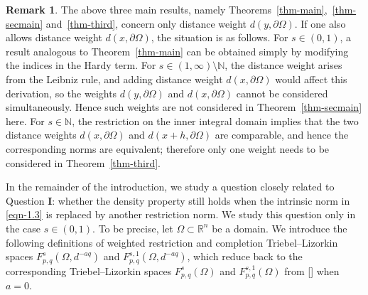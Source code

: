 \documentclass[11pt,twoside]{article}
\def\rr{{\mathbb R}}
\def\rn{{\mathbb{R}^n}}
\def\boz{{\Omega}}
\def\pa{\partial}                %
\theoremstyle{mylem}
\theoremstyle{definition}
\newtheorem{remark}[theorem]{Remark}
\numberwithin{equation}{section}
\begin{document}
\begin{remark}
The above three main results, namely
Theorems~\ref{thm-main},~\ref{thm-secmain} and~\ref{thm-third}, concern
only distance weight $d(y,\pa\boz)$. If one also allows
distance weight $d(x,\pa\boz)$, the situation is as
follows. For \(s\in(0,1)\), a result analogous to
Theorem~\ref{thm-main} can be obtained simply by modifying the indices
in the Hardy term. 
For \(s\in(1,\infty)\setminus\mathbb N\), the distance weight arises from the Leibniz rule, and adding distance weight $d(x,\pa\boz)$ would affect this derivation, so the weights $d(y,\pa\boz)$ and $d(x,\pa\boz)$ cannot be considered simultaneously.
Hence such weights are not considered in Theorem~\ref{thm-secmain} here. 
For \(s\in\mathbb N\), the
restriction on the inner integral domain implies that the two distance
weights \(d(x,\pa\boz)\) and \(d(x+h,\pa\boz)\) are comparable, and hence
the corresponding norms are equivalent; therefore only one weight needs
to be considered in Theorem~\ref{thm-third}.
\end{remark}

In the remainder of the introduction, we study a question closely related to 
Question {\bf I}: whether the density property still holds when 
the intrinsic norm in \eqref{eqn-1.3} is replaced by another  restriction norm. 
We study this question only in the case $s\in (0,1)$. To be precise, 
let $\Omega\subset \rn$ be a domain. We introduce the following definitions of 
weighted restriction and completion Triebel--Lizorkin spaces $F_{p, q}^{s}(\boz,d^{-aq})$ and 
${F}_{p,q}^{s,1}(\boz,d^{-aq})$, which reduce back 
to the corresponding Triebel--Lizorkin spaces  $F_{p, q}^{s}(\boz)$ and ${F}_{p,q}^{s,1}(\boz)$ 
from [\cite{cjlz2022,t2001,t2008}] when  $a=0$.
\end{document}
